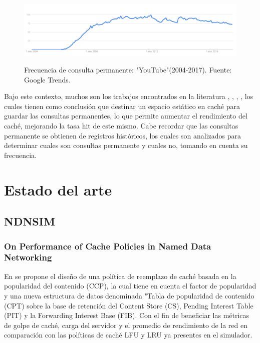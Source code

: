 \documentclass[12pt]{ociamthesis}  %
\begin{document}
\begin{figure}[!htb]
	\centering
	\includegraphics[width=15cm]{YouTube.png}\\
	\caption{Frecuencia de consulta permanente: "YouTube"(2004-2017). Fuente: Google Trends.}
	\label{google_trend_google}
\end{figure}

Bajo este contexto, muchos son los trabajos encontrados en la literatura \cite{zhang2013two}, \cite{markatos2001caching}, \cite{ozcan2012five}, \cite{kumar2008new}, los cuales tienen como conclusión que destinar un espacio estático en caché para guardar las consultas permanentes, lo que permite aumentar el rendimiento del caché, mejorando la tasa hit de este mismo. Cabe recordar que las consultas permanente se obtienen de registros históricos, los cuales son analizados para determinar cuales son consultas permanente y cuales no, tomando en cuenta su frecuencia. \\ 


\chapter{Estado del arte}
\section{NDNSIM}
\subsection{On Performance of Cache Policies in Named Data Networking \cite{ran2013performance}}

En \cite{ran2013performance} se propone el diseño de una política de reemplazo de caché basada en la popularidad del contenido (CCP), la cual tiene en cuenta el factor de popularidad y una nueva estructura de datos denominada "Tabla de popularidad de contenido (CPT) sobre la base de retención del Content Store (CS), Pending Interest Table (PIT) y la Forwarding Interest Base (FIB). Con el fin de beneficiar las métricas de golpe de caché, carga del servidor y el promedio de rendimiento de la red en comparación con las políticas de caché LFU y LRU ya presentes en el simulador.\\
\end{document}
